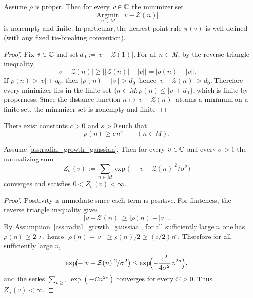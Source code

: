\begin{proposition}
\label{prop:projection_well_defined_proper}
Assume $\rho$ is proper. Then for every $v\in\mathbb{C}$ the minimizer set
$$
\operatorname*{Argmin}_{n\in M}\,|v-\mathcal{Z}(n)|
$$
is nonempty and finite. In particular, the nearest-point rule $\pi(v)$ is well-defined (with any fixed tie-breaking convention).
\end{proposition}

\begin{proof}
Fix $v\in\mathbb{C}$ and set $d_0:=|v-\mathcal{Z}(1)|$.
For all $n\in M$, by the reverse triangle inequality,
$$
|v-\mathcal{Z}(n)|\ge \bigl||\mathcal{Z}(n)|-|v|\bigr|=\bigl|\rho(n)-|v|\bigr|.
$$
If $\rho(n)>|v|+d_0$, then $\bigl|\rho(n)-|v|\bigr|>d_0$, hence $|v-\mathcal{Z}(n)|>d_0$.
Therefore every minimizer lies in the finite set $\{n\in M:\rho(n)\le |v|+d_0\}$, which is finite by properness.
Since the distance function $n\mapsto |v-\mathcal{Z}(n)|$ attains a minimum on a finite set, the minimizer set is nonempty and finite.
\end{proof}

\begin{assumption}
\label{ass:radial_growth_gaussian}
There exist constants $c>0$ and $s>0$ such that
$$
\rho(n)\ge c\,n^s\qquad (n\in M).
$$
\end{assumption}

\begin{proposition}
\label{prop:kernel_well_defined_growth}
Assume \ref{ass:radial_growth_gaussian}. Then for every $v\in\mathbb{C}$ and every $\sigma>0$ the normalizing sum
$$
Z_\sigma(v):=\sum_{n\in M}\exp\!\bigl(-|v-\mathcal{Z}(n)|^2/\sigma^2\bigr)
$$
converges and satisfies $0<Z_\sigma(v)<\infty$.
\end{proposition}

\begin{proof}
Positivity is immediate since each term is positive.
For finiteness, the reverse triangle inequality gives
$$
|v-\mathcal{Z}(n)|\ge \bigl|\rho(n)-|v|\bigr|.
$$
By Assumption~\ref{ass:radial_growth_gaussian}, for all sufficiently large $n$ one has $\rho(n)\ge 2|v|$, hence $\bigl|\rho(n)-|v|\bigr|\ge \rho(n)/2\ge (c/2)n^s$. Therefore for all sufficiently large $n$,
$$
\exp\!\bigl(-|v-\mathcal{Z}(n)|^2/\sigma^2\bigr)\le \exp\!\Bigl(-\frac{c^2}{4\sigma^2}\,n^{2s}\Bigr),
$$
and the series $\sum_{n\ge 1}\exp(-C n^{2s})$ converges for every $C>0$.
Thus $Z_\sigma(v)<\infty$.
\end{proof}

